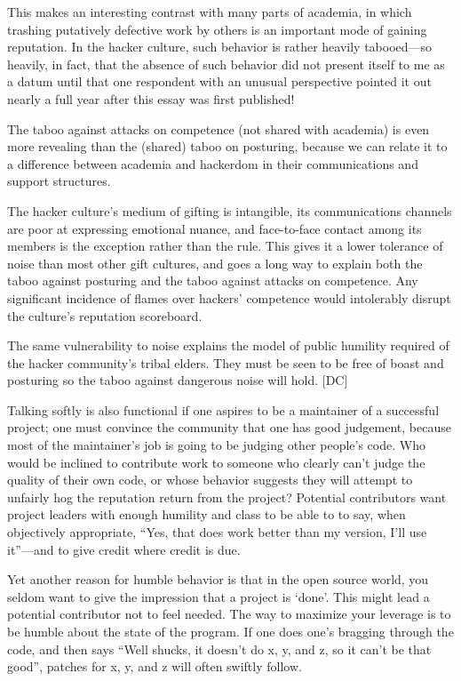 This makes an interesting contrast with many parts of academia, in which
trashing putatively defective work by others is an important mode of gaining
reputation.  In the hacker culture, such behavior is rather heavily tabooed—so
heavily, in fact, that the absence of such behavior did not present itself to me
as a datum until that one respondent with an unusual perspective pointed it out
nearly a full year after this essay was first published!

The taboo against attacks on competence (not shared with academia) is even more
revealing than the (shared) taboo on posturing, because we can relate it to a
difference between academia and hackerdom in their communications and support
structures.

The hacker culture's medium of gifting is intangible, its communications
channels are poor at expressing emotional nuance, and face-to-face contact among
its members is the exception rather than the rule.  This gives it a lower
tolerance of noise than most other gift cultures, and goes a long way to explain
both the taboo against posturing and the taboo against attacks on competence.
Any significant incidence of flames over hackers' competence would intolerably
disrupt the culture's reputation scoreboard.

The same vulnerability to noise explains the model of public humility required
of the hacker community's tribal elders.  They must be seen to be free of boast
and posturing so the taboo against dangerous noise will hold.  [DC]

Talking softly is also functional if one aspires to be a maintainer of a
successful project; one must convince the community that one has good judgement,
because most of the maintainer's job is going to be judging other people's code.
Who would be inclined to contribute work to someone who clearly can't judge the
quality of their own code, or whose behavior suggests they will attempt to
unfairly hog the reputation return from the project? Potential contributors want
project leaders with enough humility and class to be able to to say, when
objectively appropriate, ``Yes, that does work better than my version, I'll use
it''—and to give credit where credit is due.

Yet another reason for humble behavior is that in the open source world, you
seldom want to give the impression that a project is `done'.  This might lead a
potential contributor not to feel needed.  The way to maximize your leverage is
to be humble about the state of the program.  If one does one's bragging through
the code, and then says ``Well shucks, it doesn't do x, y, and z, so it can't be
that good'', patches for x, y, and z will often swiftly follow.

